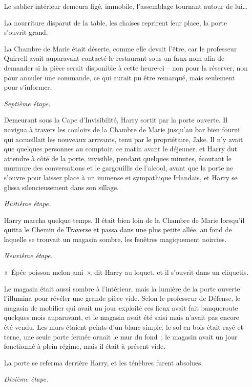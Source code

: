 Le sablier intérieur demeura figé, immobile, l'assemblage tournant autour de lui…

La nourriture disparut de la table, les chaises reprirent leur place, la porte s'ouvrit grand.

La Chambre de Marie était déserte, comme elle devait l'être, car le professeur Quirrell avait auparavant contacté le restaurant sous un faux nom afin de demander si la pièce serait disponible à cette heure-ci -- non pour la réserver, non pour annuler une commande, ce qui aurait pu être remarqué, mais seulement pour s'informer.

\emph{Septième étape.}

Demeurant sous la Cape d'Invisibilité, Harry sortit par la porte ouverte.
Il navigua à travers les couloirs de la Chambre de Marie jusqu'au bar bien fourni qui accueillait les nouveaux arrivants, tenu par le propriétaire, Jake.
Il n'y avait que quelques personnes au comptoir, ce matin avant le déjeuner, et Harry dut attendre à côté de la porte, invisible, pendant quelques minutes, écoutant le murmure des conversations et le gargouillis de l'alcool, avant que la porte ne s'ouvre pour laisser place à un immense et sympathique Irlandais, et Harry se glissa silencieusement dans son sillage.

\emph{Huitième étape.}

Harry marcha quelque temps.
Il était bien loin de la Chambre de Marie lorsqu'il quitta le Chemin de Traverse et passa dans une plus petite allée, au fond de laquelle se trouvait un magasin sombre, les fenêtres magiquement noircies.

\emph{Neuvième étape.}

«~Épée poisson melon ami~», dit Harry au loquet, et il s'ouvrit dans un cliquetis.

Le magasin était aussi sombre à l'intérieur, mais la lumière de la porte ouverte l'illumina pour révéler une grande pièce vide.
Selon le professeur de Défense, le magasin de mobilier qui avait un jour exploité ces lieux avait fait banqueroute quelques mois auparavant, et le magasin avait été saisi mais n'avait pas encore été vendu.
Les murs étaient peints d'un blanc simple, le sol en bois était rayé et terne, une seule porte fermée ornait le mur du fond~; le magasin avait un jour fonctionné à plein régime, mais il était à présent vide.

La porte se referma derrière Harry, et les ténèbres furent absolues.

\emph{Dixième étape.}

